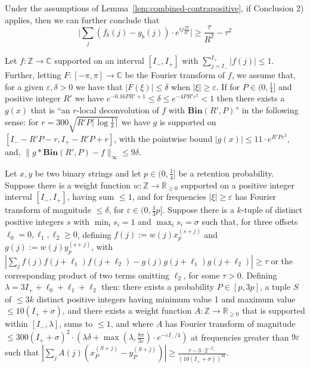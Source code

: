 \documentclass[10pt,a4paper]{amsart}
\newcommand{\Bin}[2]{\textbf{Bin}(#1,#2)}
\newcommand{\eps}{\varepsilon}
\begin{document}
\begin{corollary}\label{cor:shift}
Under the assumptions of Lemma~\ref{lem:combined-contrapositive}, if Conclusion 2) applies, then we can further conclude that \[\Big|\sum_{j} (f_b(j)-g_b(j))\cdot e^{ij\frac{2\pi}{R^2}}\Big|\geq \frac{\tau}{R^2}-\tau^2\]
\end{corollary}

\begin{corollary}\label{cor:deconvolution}
Let $f:\mathbb{Z}\rightarrow\mathbb{C}$ supported on an interval $[I_-,I_+]$ with $\sum_{j=I_-}^{I_+} |f(j)| \leq 1$. Further, letting $F:[-\pi,\pi]\rightarrow\mathbb{C}$ be the Fourier transform of $f$, we assume that, for a given $\eps,\delta>0$ we have that $|F(\xi)|\leq\delta$ when $|\xi|\geq \eps$. 
If for $P\in(0,\frac{1}{4}]$ and positive integer $R'$ we have $e^{-0.16PR'+1}\leq\delta\leq e^{-4PR'\eps^2}<1$ then there exists a $g(x)$ that is ``an $r$-local deconvolution of $f$ with $\Bin{R'}{P}$'' in the following sense: for $r=300\sqrt{R'P\lceil\log\frac{1}{\delta}\rceil}$ we have $g$ is supported on $[I_--R'P-r,I_+-R'P+r]$, with the pointwise bound $|g(x)|\leq 11\cdot e^{R'P\eps^2}$, and, $\|g\ast \Bin{R'}{P}-f\|_\infty\leq 9\delta$.
\end{corollary}

\begin{lemma}\label{lem:three-to-one}
Let $x,y$ be two binary strings and let $p\in(0,\frac{1}{4}]$ be a retention probability.
Suppose there is a weight function $w:\mathbb{Z}\rightarrow\mathbb{R}_{\geq 0}$ supported on a positive integer interval $[I_-,I_+]$, having sum $\leq 1$, and for frequencies $|\xi|\geq \eps$ has Fourier transform of magnitude $\leq \delta$, for $\eps\in(0,\frac{1}{3}p]$. Suppose there is a $k$-tuple of distinct positive integers $s$ with $\min_i s_i=1$ and $\max_i s_i=\sigma$ such that, for three offsets $\ell_0=0,\ell_1,\ell_2\geq 0$, defining $f(j):=w(j) x_p^{(s+j)}$ and $g(j):=w(j) y_p^{(s+j)}$, with $|\sum_j f(j)f(j+\ell_1)f(j+\ell_2)-g(j)g(j+\ell_1)g(j+\ell_2)|\geq \tau$ or the corresponding product of two terms omitting $\ell_2$, for some $\tau>0$. Defining $\lambda=3I_++\ell_0+\ell_1+\ell_2$ then: there exists a probability $P\in[p,3p]$, a tuple $S$ of $\leq 3k$ distinct positive integers having minimum value 1 and maximum value $\leq 10(I_++\sigma)$, and there exists a weight function $A:\mathbb{Z}\rightarrow\mathbb{R}_{\geq 0}$ that is supported within $[I_-,\lambda]$, sums to $\leq 1$, and where $A$ has Fourier transform of magnitude $\leq 300 (I_++\sigma)^2\cdot\left(\lambda\delta+\max(\lambda,\frac{8\pi}{3\eps})\cdot e^{-\eps I_-/4}\right)$ at frequencies greater than $9\eps$ such that $|\sum_j A(j)(x_P^{(S+j)}-y_P^{(S+j)})|\geq \frac{\tau-3\cdot 2^{-I_+}}{(10(I_++\sigma))^{3k}}$.
\end{lemma}
\end{document}
